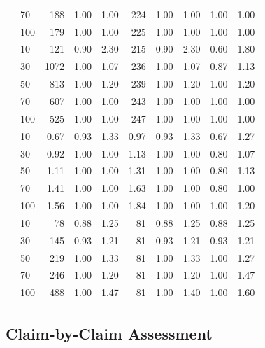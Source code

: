 \documentclass[10pt,twocolumn]{article}
\begin{document}
\begin{table}[H]
\begin{tabular}{llrrrrrrrr}
  & 70  & 188 & 1.00 & 1.00 & 224 & 1.00 & 1.00 & 1.00 & 1.00 \\
  & 100 & 179 & 1.00 & 1.00 & 225 & 1.00 & 1.00 & 1.00 & 1.00 \\
\midrule
{}
  & 10  & 121  & 0.90 & 2.30 & 215 & 0.90 & 2.30 & 0.60 & 1.80 \\
  & 30  & 1072 & 1.00 & 1.07 & 236 & 1.00 & 1.07 & 0.87 & 1.13 \\
  & 50  & 813  & 1.00 & 1.20 & 239 & 1.00 & 1.20 & 1.00 & 1.20 \\
  & 70  & 607  & 1.00 & 1.00 & 243 & 1.00 & 1.00 & 1.00 & 1.00 \\
  & 100 & 525  & 1.00 & 1.00 & 247 & 1.00 & 1.00 & 1.00 & 1.00 \\
\midrule
{}
  & 10  & 0.67 & 0.93 & 1.33 & 0.97 & 0.93 & 1.33 & 0.67 & 1.27 \\
  & 30  & 0.92 & 1.00 & 1.00 & 1.13 & 1.00 & 1.00 & 0.80 & 1.07 \\
  & 50  & 1.11 & 1.00 & 1.00 & 1.31 & 1.00 & 1.00 & 0.80 & 1.13 \\
  & 70  & 1.41 & 1.00 & 1.00 & 1.63 & 1.00 & 1.00 & 0.80 & 1.00 \\
  & 100 & 1.56 & 1.00 & 1.00 & 1.84 & 1.00 & 1.00 & 1.00 & 1.20 \\
\midrule
{}
  & 10  & 78  & 0.88 & 1.25 & 81  & 0.88 & 1.25 & 0.88 & 1.25 \\
  & 30  & 145 & 0.93 & 1.21 & 81  & 0.93 & 1.21 & 0.93 & 1.21 \\
  & 50  & 219 & 1.00 & 1.33 & 81  & 1.00 & 1.33 & 1.00 & 1.27 \\
  & 70  & 246 & 1.00 & 1.20 & 81  & 1.00 & 1.20 & 1.00 & 1.47 \\
  & 100 & 488 & 1.00 & 1.47 & 81  & 1.00 & 1.40 & 1.00 & 1.60 \\
\bottomrule
\end{tabular}
\end{table}

\subsection{Claim-by-Claim Assessment}
\end{document}
